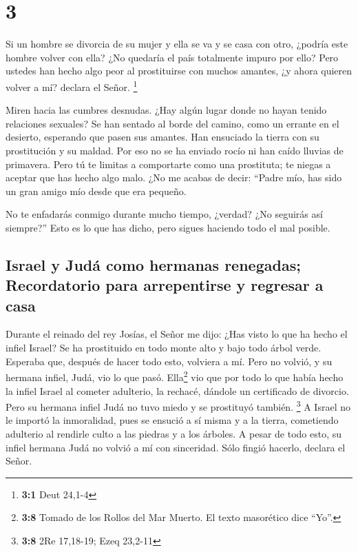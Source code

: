 \hypertarget{section-2}{%
\section{3}\label{section-2}}

 Si un hombre se divorcia de su mujer y ella se va y se
casa con otro, ¿podría este hombre volver con ella? ¿No quedaría el país
totalmente impuro por ello? Pero ustedes han hecho algo peor al
prostituirse con muchos amantes, ¿y ahora quieren volver a mí? declara
el Señor. \footnote{\textbf{3:1} Deut 24,1-4}

 Miren hacia las cumbres desnudas. ¿Hay algún lugar donde
no hayan tenido relaciones sexuales? Se han sentado al borde del camino,
como un errante en el desierto, esperando que pasen sus amantes. Han
ensuciado la tierra con su prostitución y su maldad.  Por
eso no se ha enviado rocío ni han caído lluvias de primavera. Pero tú te
limitas a comportarte como una prostituta; te niegas a aceptar que has
hecho algo malo.  ¿No me acabas de decir: ``Padre mío, has
sido un gran amigo mío desde que era pequeño.

 No te enfadarás conmigo durante mucho tiempo, ¿verdad?
¿No seguirás así siempre?'' Esto es lo que has dicho, pero sigues
haciendo todo el mal posible.

\hypertarget{israel-y-juduxe1-como-hermanas-renegadas-recordatorio-para-arrepentirse-y-regresar-a-casa}{%
\subsection{Israel y Judá como hermanas renegadas; Recordatorio para
arrepentirse y regresar a
casa}\label{israel-y-juduxe1-como-hermanas-renegadas-recordatorio-para-arrepentirse-y-regresar-a-casa}}

 Durante el reinado del rey Josías, el Señor me dijo: ¿Has
visto lo que ha hecho el infiel Israel? Se ha prostituido en todo monte
alto y bajo todo árbol verde.  Esperaba que, después de
hacer todo esto, volviera a mí. Pero no volvió, y su hermana infiel,
Judá, vio lo que pasó.  Ella\footnote{\textbf{3:8} Tomado
  de los Rollos del Mar Muerto. El texto masorético dice ``Yo''.} vio
que por todo lo que había hecho la infiel Israel al cometer adulterio,
la rechacé, dándole un certificado de divorcio. Pero su hermana infiel
Judá no tuvo miedo y se prostituyó también. \footnote{\textbf{3:8} 2Re
  17,18-19; Ezeq 23,2-11}  A Israel no le importó la
inmoralidad, pues se ensució a sí misma y a la tierra, cometiendo
adulterio al rendirle culto a las piedras y a los árboles.
 A pesar de todo esto, su infiel hermana Judá no volvió a
mí con sinceridad. Sólo fingió hacerlo, declara el Señor.

